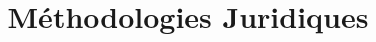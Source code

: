 \documentclass[math]{cours}
\author{}
\title{Méthodologies Juridiques}
\begin{document}
\bettertitle
\end{document}
